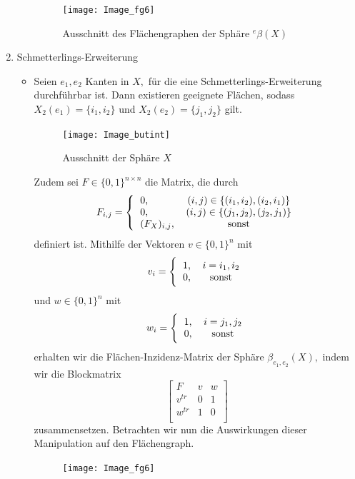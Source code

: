 \documentclass[12pt,titlepage,twoside,cleardoublepage]{article}
\theoremstyle{nummermitklammern}
\numberwithin{equation}{section}
\begin{document}
\begin{enumerate}
\begin{itemize}
\begin{figure}[H]
\begin{center}
\texttt{[image: Image\_fg6]}
\end{center}
\caption{Ausschnitt des Flächengraphen der Sphäre ${}^e\beta(X)$}
\end{figure}
\end{itemize}
\item Schmetterlings-Erweiterung
\begin{itemize}
\item Seien $e_1,e_2$ Kanten in $X,$ für die eine Schmetterlings-Erweiterung durchführbar ist. Dann existieren geeignete Flächen, sodass $X_2(e_1)=\{i_1,i_2\}$ und $X_2(e_2)=\{j_1,j_2\}$ gilt. 
\begin{figure}[H]
\begin{center}
\texttt{[image: Image\_butint]}
\end{center}
\caption{Ausschnitt der Sphäre $X$}
\end{figure}
Zudem sei $F\in \{0,1\}^{n\times n} $ die Matrix, die durch   
\[
F_{i,j}=
\Biggl{\{\begin{tabular}[l]{lcr}
0,&\textcolor{black}{$(i,j)\in \{(i_1,i_2),(i_2,i_1)\}$} \\
0,&\textcolor{black}{$(i,j)\in \{(j_1,j_2),(j_2,j_1)\}$} \\
$(F_{X})_{i,j}$,& sonst\\
\end{tabular}}
\]
definiert ist. Mithilfe der Vektoren $v\in \{0,1\}^n $ mit 
\[
v_{i}=
\Biggl{\{\begin{tabular}[l]{lcr}
1,& $i=i_1,i_2$\\
0,& sonst\\
\end{tabular}}
\]
und $w\in \{0,1\}^n $ mit 
\[
w_{i}=
\Biggl{\{\begin{tabular}[l]{lcr}
1,& $i=j_1,j_2$\\
0,& sonst\\ 
\end{tabular}}
\]
erhalten wir die Flächen-Inzidenz-Matrix der Sphäre $\beta_{e_1,e_2}(X)
,$ indem wir die Blockmatrix 
\[
\left[ 
\begin{array}{c|cc} 
  F & v& w \\ 
  \hline 
  v^{tr}& 0 &1 \\
  w^{tr} &1 &0  \\
\end{array} 
\right]
\]
zusammensetzen. Betrachten wir nun die Auswirkungen dieser Manipulation auf den Flächengraph. 
\begin{figure}[H]
\begin{center}
\texttt{[image: Image\_fg6]}

\end{center}
\end{figure}
\end{itemize}
\end{enumerate}
\end{document}
